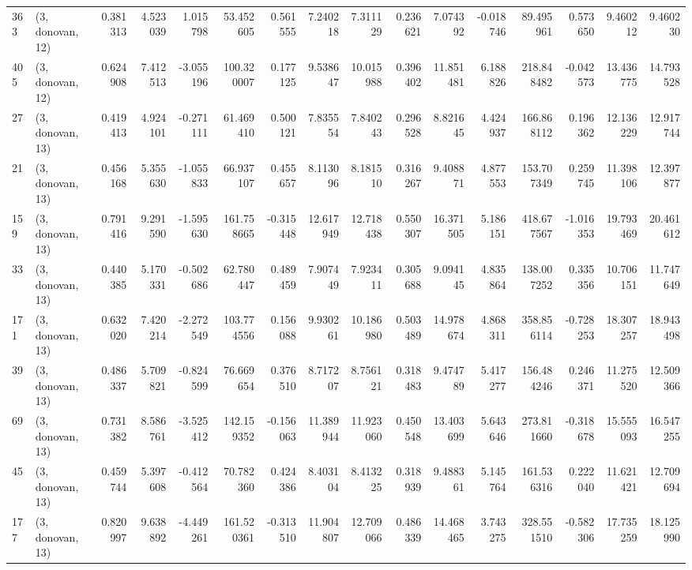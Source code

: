\begin{tabular}{llrrrrrrrrrrrrrr}
363 &  (3, donovan, 12) &   0.381313 &   4.523039 &   1.015798 &    53.452605 &   0.561555 &   7.240218 &   7.311129 &  0.236621 &   7.074392 &  -0.018746 &    89.495961 &  0.573650 &   9.460212 &   9.460230 \\
405 &  (3, donovan, 12) &   0.624908 &   7.412513 &  -3.055196 &   100.320007 &   0.177125 &   9.538647 &  10.015988 &  0.396402 &  11.851481 &   6.188826 &   218.848482 & -0.042573 &  13.436775 &  14.793528 \\
27  &  (3, donovan, 13) &   0.419413 &   4.924101 &  -0.271111 &    61.469410 &   0.500121 &   7.835554 &   7.840243 &  0.296528 &   8.821645 &   4.424937 &   166.868112 &  0.196362 &  12.136229 &  12.917744 \\
21  &  (3, donovan, 13) &   0.456168 &   5.355630 &  -1.055833 &    66.937107 &   0.455657 &   8.113096 &   8.181510 &  0.316267 &   9.408871 &   4.877553 &   153.707349 &  0.259745 &  11.398106 &  12.397877 \\
159 &  (3, donovan, 13) &   0.791416 &   9.291590 &  -1.595630 &   161.758665 &  -0.315448 &  12.617949 &  12.718438 &  0.550307 &  16.371505 &   5.186151 &   418.677567 & -1.016353 &  19.793469 &  20.461612 \\
33  &  (3, donovan, 13) &   0.440385 &   5.170331 &  -0.502686 &    62.780447 &   0.489459 &   7.907449 &   7.923411 &  0.305688 &   9.094145 &   4.835864 &   138.007252 &  0.335356 &  10.706151 &  11.747649 \\
171 &  (3, donovan, 13) &   0.632020 &   7.420214 &  -2.272549 &   103.774556 &   0.156088 &   9.930261 &  10.186980 &  0.503489 &  14.978674 &   4.868311 &   358.856114 & -0.728253 &  18.307257 &  18.943498 \\
39  &  (3, donovan, 13) &   0.486337 &   5.709821 &  -0.824599 &    76.669654 &   0.376510 &   8.717207 &   8.756121 &  0.318483 &   9.474789 &   5.417277 &   156.484246 &  0.246371 &  11.275520 &  12.509366 \\
69  &  (3, donovan, 13) &   0.731382 &   8.586761 &  -3.525412 &   142.159352 &  -0.156063 &  11.389944 &  11.923060 &  0.450548 &  13.403699 &   5.643646 &   273.811660 & -0.318678 &  15.555093 &  16.547255 \\
45  &  (3, donovan, 13) &   0.459744 &   5.397608 &  -0.412564 &    70.782360 &   0.424386 &   8.403104 &   8.413225 &  0.318939 &   9.488361 &   5.145764 &   161.536316 &  0.222040 &  11.621421 &  12.709694 \\
177 &  (3, donovan, 13) &   0.820997 &   9.638892 &  -4.449261 &   161.520361 &  -0.313510 &  11.904807 &  12.709066 &  0.486339 &  14.468465 &   3.743275 &   328.551510 & -0.582306 &  17.735259 &  18.125990 \\

\end{tabular}
